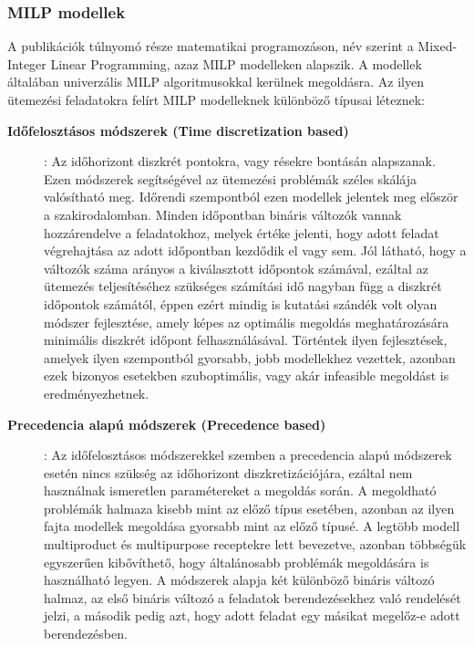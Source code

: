 \subsubsection{MILP modellek}
A publikációk túlnyomó része matematikai programozáson, név szerint a Mixed-Integer Linear Programming, azaz MILP modelleken alapszik.
A modellek általában univerzális MILP algoritmusokkal kerülnek megoldásra. \cite{9780471283669}
Az ilyen ütemezési feladatokra felírt MILP modelleknek különböző típusai léteznek:
\begin{description}
\item[\textbf{Időfelosztásos módszerek (Time discretization based)}]: Az időhorizont diszkrét pontokra, vagy résekre bontásán alapszanak. Ezen módszerek segítségével az ütemezési problémák széles skálája valósítható meg.
Időrendi szempontból ezen modellek jelentek meg először a szakirodalomban. \cite{KONDILI1993211}
Minden időpontban bináris változók vannak hozzárendelve a feladatokhoz, melyek értéke jelenti, hogy adott feladat végrehajtása az adott időpontban kezdődik el vagy sem.
Jól látható, hogy a változók száma arányos a kiválasztott időpontok számával, ezáltal az ütemezés teljesítéséhez szükséges számítási idő nagyban függ a diszkrét időpontok számától, éppen ezért mindig is kutatási szándék volt olyan módszer fejlesztése, amely képes az optimális megoldás meghatározására minimális diszkrét időpont felhasználásával.
Történtek ilyen fejlesztések, amelyek ilyen szempontból gyorsabb, jobb modellekhez vezettek, azonban ezek bizonyos esetekben szuboptimális, vagy akár infeasible megoldást is eredményezhetnek.
\item[\textbf{Precedencia alapú módszerek (Precedence based)}]: Az időfelosztásos módszerekkel szemben a precedencia alapú módszerek esetén nincs szükség az időhorizont diszkretizációjára, ezáltal nem használnak ismeretlen paramétereket a megoldás során.
A megoldható problémák halmaza kisebb mint az előző típus esetében, azonban az ilyen fajta modellek megoldása gyorsabb mint az előző típusé.
A legtöbb modell multiproduct és multipurpose receptekre lett bevezetve, azonban többségük egyszerűen kibővíthető, hogy általánosabb problémák megoldására is használható legyen.
A módszerek alapja két különböző bináris változó halmaz, az első bináris változó a feladatok berendezésekhez való rendelését jelzi, a második pedig azt, hogy adott feladat egy másikat megelőz-e adott berendezésben.
\end{description}
